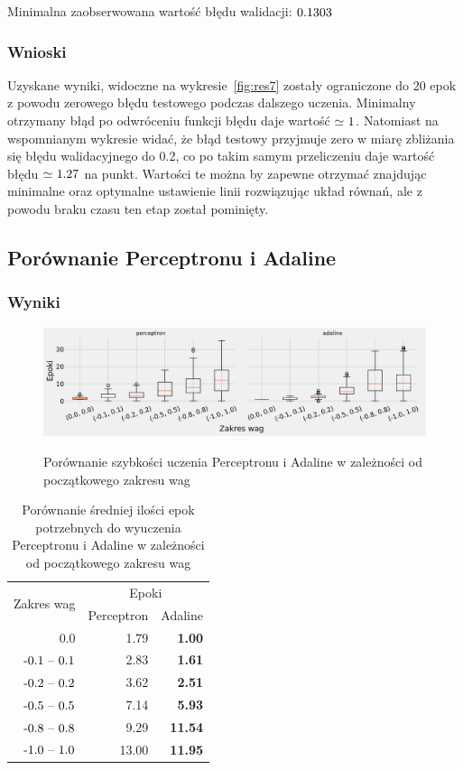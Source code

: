 \documentclass{article}
\begin{document}
Minimalna zaobserwowana wartość błędu walidacji: \($0.1303$\)

\subsubsection*{Wnioski}

Uzyskane wyniki, widoczne na wykresie~\ref{fig:res7} zostały ograniczone do 20 epok z powodu zerowego błędu testowego podczas dalszego uczenia. Minimalny otrzymany błąd po odwróceniu funkcji błędu daje wartość \(\simeq\ $1$\). Natomiast na wspomnianym wykresie widać, że błąd testowy przyjmuje zero w miarę zbliżania się błędu walidacyjnego do 0.2, co po takim samym przeliczeniu daje wartość błędu \(\simeq\ $1.27$\) na punkt. Wartości te można by zapewne otrzymać znajdując minimalne oraz optymalne ustawienie linii rozwiązując układ równań, ale z powodu braku czasu ten etap został pominięty.

\newpage
\subsection{Porównanie Perceptronu i Adaline}
\subsubsection*{Wyniki}

\begin{figure}[!h]
	\centering
	\caption{Porównanie szybkości uczenia Perceptronu i Adaline w zależności od początkowego zakresu wag}
	\includegraphics[width=\textwidth]{ada_per_w.png}
	\label{fig:res81}
\end{figure}

\begin{table}[!h]
	\caption{Porównanie średniej ilości epok potrzebnych do wyuczenia Perceptronu i Adaline w zależności od początkowego zakresu wag}
	\label{tabela-res-81}
	\centering
	\begin{tabular}{rrr}
		\toprule
		\multirow{2}{*}{Zakres wag}   & \multicolumn{2}{c}{Epoki} \\
		                  & Perceptron & Adaline        \\
		\midrule
		0.0               & 1.79       & \textbf{1.00}  \\
		\($-0.1 -- 0.1$\) & 2.83       & \textbf{1.61}  \\
		\($-0.2 -- 0.2$\) & 3.62       & \textbf{2.51}  \\
		\($-0.5 -- 0.5$\) & 7.14       & \textbf{5.93}  \\
		\($-0.8 -- 0.8$\) & 9.29       & \textbf{11.54} \\
		\($-1.0 -- 1.0$\) & 13.00      & \textbf{11.95} \\
		\bottomrule
	\end{tabular}
\end{table}
\end{document}
